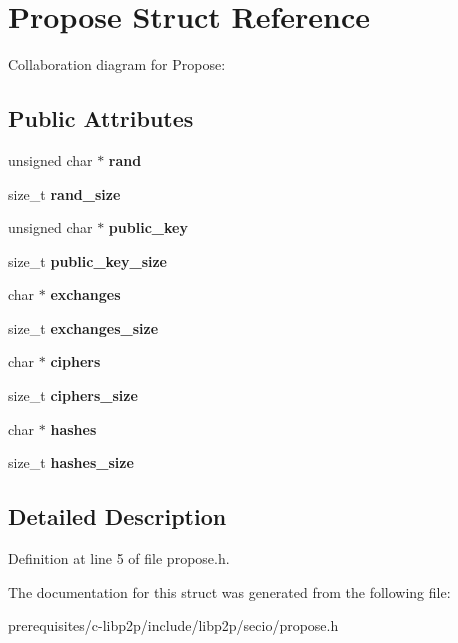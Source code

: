 \hypertarget{struct_propose}{}\section{Propose Struct Reference}
\label{struct_propose}


Collaboration diagram for Propose\+:
\subsection*{Public Attributes}
\begin{DoxyCompactItemize}
\item 
\mbox{\label{struct_propose_a51f1a11a83aebd95b923d1ed2a149f05}} 
unsigned char $\ast$ {\bfseries rand}
\item 
\mbox{\label{struct_propose_a22993a2ab6b181bb7816ace8704fb667}} 
size\+\_\+t {\bfseries rand\+\_\+size}
\item 
\mbox{\label{struct_propose_aaa570c1b8b78cf58d5f7f6d82ce17c39}} 
unsigned char $\ast$ {\bfseries public\+\_\+key}
\item 
\mbox{\label{struct_propose_a9834b58f2959195965efe693e8a76481}} 
size\+\_\+t {\bfseries public\+\_\+key\+\_\+size}
\item 
\mbox{\label{struct_propose_acf5c93e2b821ed441c4a90f0d9a888a3}} 
char $\ast$ {\bfseries exchanges}
\item 
\mbox{\label{struct_propose_a7065556ddbafa3f71e574e0506ce0f0c}} 
size\+\_\+t {\bfseries exchanges\+\_\+size}
\item 
\mbox{\label{struct_propose_af406f9686f57205d9b52a79b98bd8a42}} 
char $\ast$ {\bfseries ciphers}
\item 
\mbox{\label{struct_propose_ab618f8b01df66ead9de8a3760b7f022a}} 
size\+\_\+t {\bfseries ciphers\+\_\+size}
\item 
\mbox{\label{struct_propose_aac2ef1d61e006ca9ab2ec7f33339e985}} 
char $\ast$ {\bfseries hashes}
\item 
\mbox{\label{struct_propose_a31857d8a0bfa5f6b5a000e59d6213b50}} 
size\+\_\+t {\bfseries hashes\+\_\+size}
\end{DoxyCompactItemize}


\subsection{Detailed Description}


Definition at line 5 of file propose.\+h.



The documentation for this struct was generated from the following file\+:\begin{DoxyCompactItemize}
\item 
prerequisites/c-\/libp2p/include/libp2p/secio/propose.\+h\end{DoxyCompactItemize}
